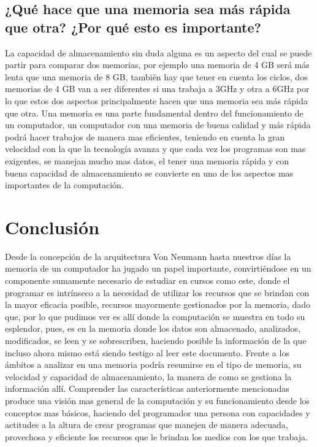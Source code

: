 \documentclass{article}
\begin{document}
    
    
    \subsection{¿Qué hace que una memoria sea más rápida que otra? ¿Por qué esto es importante?}
    La capacidad de almacenamiento sin duda alguna es un aspecto del cual se puede partir para comparar dos memorias, por ejemplo una memoria de 4 GB será más lenta que una memoria de 8 GB, también hay que tener en cuenta los ciclos, dos memorias de 4 GB van a ser diferentes si una trabaja a 3GHz y otra a 6GHz por lo que estos dos aspectos principalmente hacen que una memoria sea más rápida que otra. Una memoria es una parte fundamental dentro del funcionamiento de un computador, un computador con una memoria de buena calidad y más rápida podrá hacer trabajos de manera mas eficientes, teniendo en cuenta la gran velocidad con la que la tecnología avanza y que cada vez los programas son mas exigentes, se manejan mucho mas datos, el tener una memoria rápida y con buena capacidad de almacenamiento se convierte en uno de los aspectos mas importantes de la computación. 


\section{Conclusión} \label{conclulsion}
Desde la concepción de la arquitectura Von Neumann hasta nuestros días la memoria de un computador ha jugado un papel importante, convirtiéndose en un componente sumamente necesario de estudiar en cursos como este, donde el programar es intrínseco a la necesidad de utilizar los recursos que se brindan con la mayor eficacia posible, recursos mayormente gestionados por la memoria, dado que, por lo que pudimos ver es allí donde la computación se muestra en todo su esplendor, pues, es en la memoria donde los datos son almacenado, analizados, modificados, se leen y se sobrescriben, haciendo posible la información de la que incluso ahora mismo está siendo testigo al leer este documento. Frente a los ámbitos a analizar en una memoria podría resumirse en el tipo de memoria, su velocidad y capacidad de almacenamiento, la manera de como se gestiona la información allí. Comprender las características anteriormente mencionadas produce una  visión mas general de la computación y su funcionamiento desde los conceptos mas básicos, haciendo del programador una persona con capacidades y actitudes a la altura de crear programas que manejen de manera adecuada, provechosa y eficiente los recursos que le brindan los medios con los que trabaja.


\cite{rebollo}
\cite{Beekman}
\cite{barcelo}
\cite{Mano}
\end{document}
